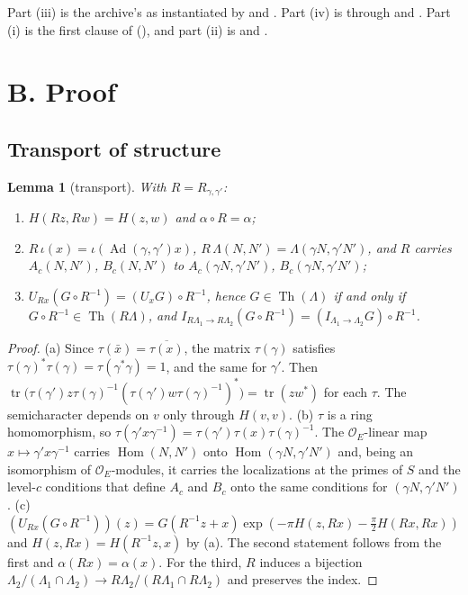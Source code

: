\documentclass[11pt]{article}
\newcommand{\Ad}{\operatorname{Ad}}
\newcommand{\tr}{\operatorname{tr}}
\newcommand{\Hom}{\operatorname{Hom}}
\newcommand{\Th}{\operatorname{Th}}
\newcommand{\OEr}{\mathcal O_E}
\newtheorem{lemma}[theorem]{Lemma}
\theoremstyle{definition}
\theoremstyle{remark}
\begin{document}
\noindent Part (iii) is the archive's  as instantiated by  and . Part (iv) is  through  and . Part (i) is the first clause of  (), and part (ii) is  and .

\section{B. Proof}\label{sec:B}

\subsection{Transport of structure}

\begin{lemma}[transport]\label{lem:T}
With $R=R_{\gamma,\gamma'}$:
\begin{enumerate}[label=(\alph*),itemsep=1pt]
\item $H(Rz,Rw)=H(z,w)$ and $\alpha\circ R=\alpha$;
\item $R\,\iota(x)=\iota(\Ad(\gamma,\gamma')x)$, $R\,\Lambda(N,N')=\Lambda(\gamma N,\gamma'N')$, and $R$ carries $A_c(N,N')$, $B_c(N,N')$ to $A_c(\gamma N,\gamma'N')$, $B_c(\gamma N,\gamma'N')$;
\item $U_{Rx}(G\circ R^{-1})=(U_xG)\circ R^{-1}$, hence $G\in\Th(\Lambda)$ if and only if $G\circ R^{-1}\in\Th(R\Lambda)$, and $I_{R\Lambda_1\to R\Lambda_2}(G\circ R^{-1})=(I_{\Lambda_1\to\Lambda_2}G)\circ R^{-1}$.
\end{enumerate}
\end{lemma}

\begin{proof}
(a) Since $\tau(\bar x)=\overline{\tau(x)}$, the matrix $\tau(\gamma)$ satisfies $\tau(\gamma)^*\tau(\gamma)=\tau(\gamma^*\gamma)=1$, and the same for $\gamma'$. Then $\tr\bigl(\tau(\gamma')z\tau(\gamma)^{-1}(\tau(\gamma')w\tau(\gamma)^{-1})^*\bigr)=\tr(zw^*)$ for each $\tau$. The semicharacter depends on $v$ only through $H(v,v)$.
(b) $\tau$ is a ring homomorphism, so $\tau(\gamma'x\gamma^{-1})=\tau(\gamma')\tau(x)\tau(\gamma)^{-1}$. The $\OEr$-linear map $x\mapsto\gamma'x\gamma^{-1}$ carries $\Hom(N,N')$ onto $\Hom(\gamma N,\gamma'N')$ and, being an isomorphism of $\OEr$-modules, it carries the localizations at the primes of $S$ and the level-$c$ conditions that define $A_c$ and $B_c$ onto the same conditions for $(\gamma N,\gamma' N')$.
(c) $(U_{Rx}(G\circ R^{-1}))(z)=G(R^{-1}z+x)\exp(-\pi H(z,Rx)-\frac\pi2H(Rx,Rx))$ and $H(z,Rx)=H(R^{-1}z,x)$ by (a). The second statement follows from the first and $\alpha(Rx)=\alpha(x)$. For the third, $R$ induces a bijection $\Lambda_2/(\Lambda_1\cap\Lambda_2)\to R\Lambda_2/(R\Lambda_1\cap R\Lambda_2)$ and preserves the index.
\end{proof}
\end{document}
